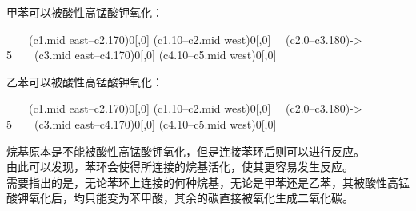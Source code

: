 \documentclass[UTF8]{ctexart}
\begin{document}
    甲苯可以被酸性高锰酸钾氧化：\vspace{10pt}
    \begin{center}
        ~~~~\arrow(c1.mid east--c2.170){0}[,0]
            \arrow(c1.10--c2.mid west){0}[,0]\+{4pt,4pt,1pt}
            \+{2pt,2pt,1pt}
            ~~\arrow(c2.0--c3.180){->}~~
            5~~~~\arrow(c3.mid east--c4.170){0}[,0]
            \arrow(c4.10--c5.mid west){0}[,0]\+{2pt,4pt,1pt}
            \+{2pt,2pt,1pt}
            \+{2pt,2pt,1pt}
        \schemestop
    \end{center}\vspace{20pt}
    乙苯可以被酸性高锰酸钾氧化：\vspace{-5pt}
    \begin{center}
        ~~~~\arrow(c1.mid east--c2.170){0}[,0]
            \arrow(c1.10--c2.mid west){0}[,0]\+{4pt,4pt,1pt}
            \+{2pt,2pt,1pt}
            ~~\arrow(c2.0--c3.180){->}~~
            5~~~~\arrow(c3.mid east--c4.170){0}[,0]
            \arrow(c4.10--c5.mid west){0}[,0]\+{2pt,4pt,1pt}
            \+{2pt,2pt,1pt}
            \+{2pt,2pt,1pt}
            \+{2pt,2pt,1pt}
        \schemestop
    \end{center}\vspace{20pt}
    烷基原本是不能被酸性高锰酸钾氧化，但是连接苯环后则可以进行反应。\\[3mm]
    由此可以发现，苯环会使得所连接的烷基活化，使其更容易发生反应。\\[5mm]
    需要指出的是，无论苯环上连接的何种烷基，无论是甲苯还是乙苯，其被酸性高锰酸钾氧化后，均只能变为苯甲酸，其余的碳直接被氧化生成二氧化碳。
\end{document}
